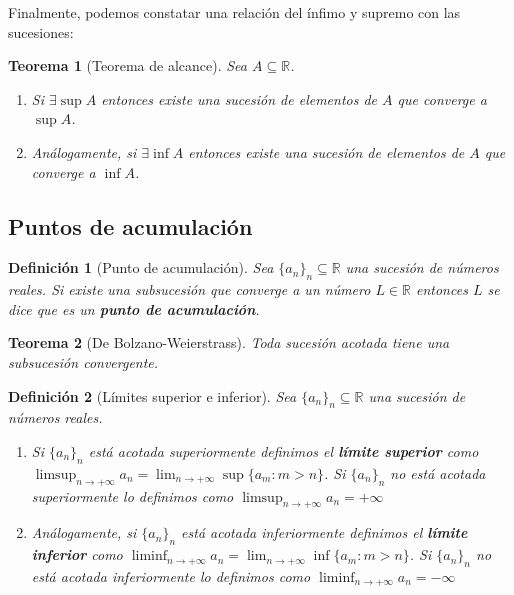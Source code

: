 \documentclass{article}
\newtheorem{theorem}{Teorema}
\newtheorem{define}{Definición}
\newcommand{\reales}{\mathbb{R}}
\newcommand{\sucesion}[1]{\{ #1 _n \}_n}
\newcommand{\sucreal}[1]{\{ #1 _n \}_n \subseteq \reales}
\newcommand{\limitesup}[1]{\limsup_{n\rightarrow +\infty} #1 _n}
\newcommand{\limiteinf}[1]{\liminf_{n\rightarrow +\infty} #1 _n}
\begin{document}
Finalmente, podemos constatar una relación del ínfimo y supremo con las sucesiones:

\begin{theorem}[Teorema de alcance]
	Sea $A \subseteq \reales$. 
\begin{enumerate}
\item
	Si $\exists \sup A$ entonces existe una sucesión de elementos de $A$ que converge a $\sup A$.
\item
	Análogamente, si $\exists \inf A$ entonces existe una sucesión de elementos de $A$ que converge a $\inf A$.
\end{enumerate}	

\end{theorem}







\subsection{Puntos de acumulación}
\begin{define}[Punto de acumulación]
	Sea $\sucreal{a}$ una sucesión de números reales. Si existe una subsucesión que converge a un número $L \in \reales$ entonces $L$ se dice que es un \textbf{punto de acumulación}.
\end{define}

\begin{theorem}[De Bolzano-Weierstrass]
\label{thm_bolzano_weierstrass}
	Toda sucesión acotada tiene una subsucesión convergente.
\end{theorem}

\begin{define}[Límites superior e inferior]
	Sea $\sucreal{a}$ una sucesión de números reales. 
	\begin{enumerate}
	\item
	Si $\sucesion{a}$ está acotada superiormente definimos el \textbf{límite superior} como $\limitesup{a} = \lim_{n \rightarrow +\infty} \sup\{ a_m : m > n\}$. Si $\sucesion{a}$ no está acotada superiormente lo definimos como $\limsup_{n\rightarrow +\infty} a_n = +\infty$
	\item
	Análogamente, si $\sucesion{a}$ está acotada inferiormente definimos el \textbf{límite inferior} como $\limiteinf{a} = \lim_{n \rightarrow +\infty} \inf\{ a_m : m > n\}$. Si $\sucesion{a}$ no está acotada inferiormente lo definimos como $\liminf_{n\rightarrow +\infty} a_n = -\infty$
	\end{enumerate}
\end{define}
\end{document}
